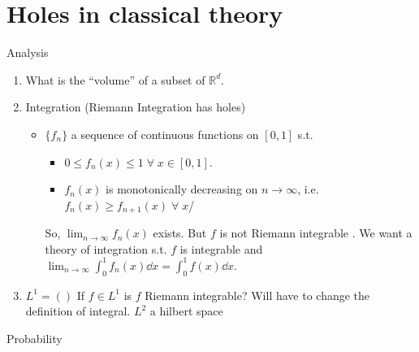 
\def\npart {II}
\def\nterm {Michaelmas}
\def\nyear {2023}
\def\nlecturer {Dr Sarkar}
\def\ncourse {Probability and Measure}



% 

\setcounter{section}{-1}


    \maketitle
    \tableofcontents

    \section{Holes in classical theory}

    Analysis

    \begin{enumerate}
        \item What is the ``volume'' of a subset of $\mathbb{R}^d$.
        \item Integration (Riemann Integration has holes)
        \begin{itemize}
            \item $\{f_n\}$ a sequence of continuous functions on $[0, 1]$ s.t.
            \begin{itemize}
                \item $0 \leq f_n(x) \leq 1 \; \forall \; x \in [0, 1]$.
                \item $f_n(x)$ is monotonically decreasing on $n \to \infty$, i.e. $f_n(x) \geq f_{n+1}(x) \; \forall \; x$/
            \end{itemize}
            So, $\lim_{n \to \infty} f_n(x)$ exists. But $f$ is not Riemann integrable . We want a theory of integration s.t. $f$ is integrable and $\lim_{n \to \infty} \int_{0}^{1} f_n(x) \dd{x} = \int_{0}^{1} f(x) \dd{x}$.
        \end{itemize}
        \item $L^1 = ()$
        If $f \in L^1$ is $f$ Riemann integrable? Will have to change the definition of integral. $L^2$ a hilbert space
    \end{enumerate}

    Probability

